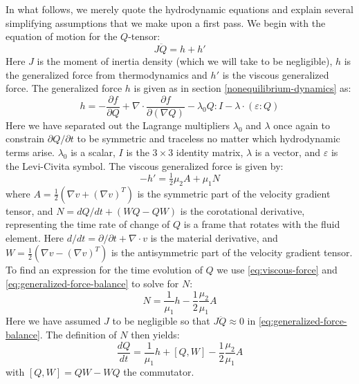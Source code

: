 \documentclass[reqno]{article}
\begin{document}
  In what follows, we merely quote the hydrodynamic equations and explain
  several simplifying assumptions that we make upon a first pass.
  We begin with the equation of motion for the $Q$-tensor:
  \begin{equation} \label{eq:generalized-force-balance}
    J \ddot{Q} = h + h'
  \end{equation}
  Here $J$ is the moment of inertia density (which we will take to be
  negligible), $h$ is the generalized force from thermodynamics and $h'$ is the
  viscous generalized force.
  The generalized force $h$ is given as in section
  \ref{nonequilibrium-dynamics} as:
  \begin{equation}
    h
    =
    -\frac{\partial f}{\partial Q}
    + \nabla \cdot \frac{\partial f}{\partial (\nabla Q)}
    - \lambda_0 Q : I
    - \lambda \cdot \left( \varepsilon : Q \right)
  \end{equation}
  Here we have separated out the Lagrange multipliers $\lambda_0$ and $\lambda$
  once again to constrain $\partial Q/\partial t$ to be symmetric and traceless
  no matter which hydrodynamic terms arise.
  $\lambda_0$ is a scalar, $I$ is the $3\times 3$ identity matrix, $\lambda$ is
  a vector, and $\varepsilon$ is the Levi-Civita symbol.
  The viscous generalized force is given by:
  \begin{equation} \label{eq:viscous-force}
    -h'
    =
    \tfrac12 \mu_2 A
    + \mu_1 N
  \end{equation}
  where $A = \tfrac12 \left( \nabla v + \left( \nabla v \right)^T \right)$ is
  the symmetric part of the velocity gradient tensor, and $N = dQ / dt + (WQ -
  QW)$ is the corotational derivative, representing the time rate of change of
  $Q$ is a frame that rotates with the fluid element.
  Here $d/dt = \partial / \partial t + \nabla \cdot v$ is the material
  derivative, and $W = \tfrac12 \left( \nabla v - \left( \nabla v \right)^T
  \right)$ is the antisymmetric part of the velocity gradient tensor.
  To find an expression for the time evolution of $Q$ we use
  \eqref{eq:viscous-force} and \eqref{eq:generalized-force-balance} to
  solve for $N$:
  \begin{equation} \label{eq:N}
    N = \frac{1}{\mu_1} h - \frac12 \frac{\mu_2}{\mu_1} A
  \end{equation}
  Here we have assumed $J$ to be negligible so that $J\ddot{Q} \approx 0$ in
  \eqref{eq:generalized-force-balance}.
  The definition of $N$ then yields:
  \begin{equation} \label{eq:Q-equation}
    \frac{d Q}{dt}
    =
    \frac{1}{\mu_1} h
    + \left[ Q, W \right]
    - \frac12 \frac{\mu_2}{\mu_1} A
  \end{equation}
  with $\left[ Q, W \right] = QW - WQ$ the commutator.
\end{document}
